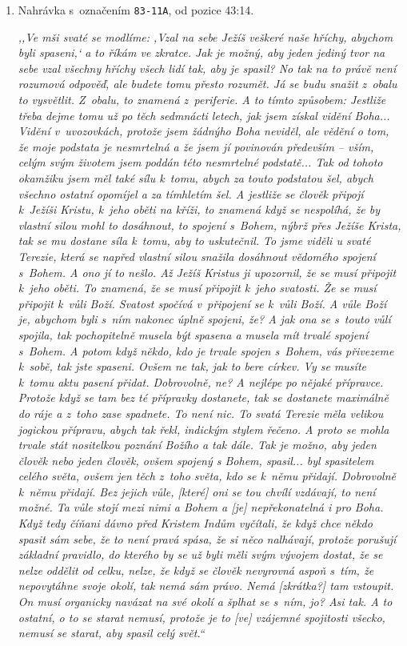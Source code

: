 \begin{enumerate}
{}

\item{
Nahrávka s~označením \texttt{83-11A}, od pozice 43:14.

\textit{%
,,Ve mši svaté se modlíme: ,Vzal na sebe Ježíš veškeré naše hříchy, abychom byli
spaseni,` a to říkám ve zkratce. Jak je možný, aby jeden jediný tvor na sebe
vzal všechny hříchy všech lidí tak, aby je spasil? No tak na to právě není
rozumová odpověď, ale budete tomu přesto rozumět. Já se budu snažit z~obalu to
vysvětlit. Z~obalu, to znamená z~periferie. A to tímto způsobem: Jestliže třeba
dejme tomu už po těch sedmnácti letech, jak jsem získal vidění Boha... Vidění
v~uvozovkách, protože jsem žádnýho Boha neviděl, ale vědění o tom, že moje
podstata je nesmrtelná a že jsem jí povinován především -- vším, celým svým
životem jsem poddán této nesmrtelné podstatě... Tak od tohoto okamžiku jsem měl
také sílu k~tomu, abych za touto podstatou šel, abych všechno ostatní opomíjel a
za tímhletím šel. A jestliže se člověk připojí k~Ježíši Kristu, k~jeho oběti na
kříži, to znamená když se nespolíhá, že by vlastní silou mohl to dosáhnout, to
spojení s~Bohem, nýbrž přes Ježíše Krista, tak se mu dostane síla k~tomu, aby to
uskutečnil. To jsme viděli u svaté Terezie, která se napřed vlastní silou
snažila dosáhnout vědomého spojení s~Bohem. A ono jí to nešlo. Až Ježíš Kristus
ji upozornil, že se musí připojit k~jeho oběti. To znamená, že se musí připojit
k~jeho svatosti. Že se musí připojit k~vůli Boží. Svatost spočívá v~připojení se
k~vůli Boží. A vůle Boží je, abychom byli s~ním nakonec úplně spojeni, že? A jak
ona se s~touto vůlí spojila, tak pochopitelně musela být spasena a musela mít
trvalé spojení s~Bohem. A potom když někdo, kdo je trvale spojen s~Bohem, vás
přivezeme k~sobě, tak jste spaseni. Ovšem ne tak, jak to bere církev. Vy se
musíte k~tomu aktu pasení přidat. Dobrovolně, ne? A nejlépe po nějaké přípravce.
Protože když se tam bez té přípravky dostanete, tak se dostanete maximálně do
ráje a z~toho zase spadnete. To není nic. To svatá Terezie měla velikou jogickou
přípravu, abych tak řekl, indickým stylem řečeno. A proto se mohla trvale stát
nositelkou poznání Božího a tak dále. Tak je možno, aby jeden člověk nebo jeden
člověk, ovšem spojený s Bohem, spasil... byl spasitelem celého světa, ovšem jen
těch z~toho světa, kdo se k~němu přidají. Dobrovolně k~němu přidají. Bez jejich
vůle, [které] oni se tou chvílí vzdávají, to není možné. Ta vůle stojí mezi nimi
a Bohem a [je] nepřekonatelná i pro Boha. Když tedy číňani dávno před Kristem
Indům vyčítali, že když chce někdo spasit sám sebe, že to není pravá spása, že
si něco nalhávají, protože porušují základní pravidlo, do kterého by se už byli
měli svým vývojem dostat, že se nelze oddělit od celku, nelze, že když se člověk
nevyrovná aspoň s~tím, že nepovytáhne svoje okolí, tak nemá sám právo. Nemá
[zkrátka?] tam vstoupit. On musí organicky navázat na své okolí a šplhat se
s~ním, jo? Asi tak. A to ostatní, o to se starat nemusí, protože je to [ve]
vzájemné spojitosti všecko, nemusí se starat, aby spasil celý svět.``
}
}

\end{enumerate}

